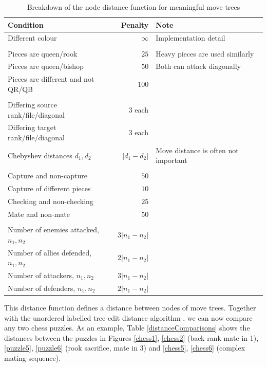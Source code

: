 \begin{table}[H]
  \centering
  \begin{tabular}{lrl}
      Condition & Penalty & Note \\
      \hline
      Different colour & $\infty$ & Implementation detail \\
      &&\\
      Pieces are queen/rook & $25$ & Heavy pieces are used similarly \\
      Pieces are queen/bishop& $50$ & Both can attack diagonally \\
      Pieces are different and not QR/QB& $100$ & \\
      &&\\
      Differing source rank/file/diagonal & $3$ each & \\
      Differing target rank/file/diagonal & $3$ each & \\
      Chebyshev distances $d_1, d_2$ & $|d_1-d_2|$ & Move distance is often
      not important \\
      &&\\
      Capture and non-capture & $50$ & \\
      Capture of different pieces & $10$ & \\
      Checking and non-checking & $25$ & \\
      Mate and non-mate & $50$ & \\
      &&\\
      Number of enemies attacked, $n_1, n_2$ & $3|n_1-n_2|$ & \\
      Number of allies defended, $n_1, n_2$ & $2|n_1-n_2|$ & \\
      Number of attackers, $n_1, n_2$ & $3|n_1-n_2|$ & \\
      Number of defenders, $n_1, n_2$ & $2|n_1-n_2|$ & \\
  \end{tabular}
  \caption{Breakdown of the node distance function for meaningful move trees}
  \label{distanceTable}
\end{table}

This distance function defines a distance between nodes of move trees. Together
with the unordered labelled tree edit distance algorithm \citep{editDistTrees},
we can now compare any two chess puzzles. As an example, Table
\ref{distanceComparisons} shows the distances between the puzzles in Figures
\ref{chess1}, \ref{chess2} (back-rank mate in 1), \ref{puzzle5}, \ref{puzzle6}
(rook sacrifice, mate in 3) and \ref{chess5}, \ref{chess6} (complex mating
sequence).

